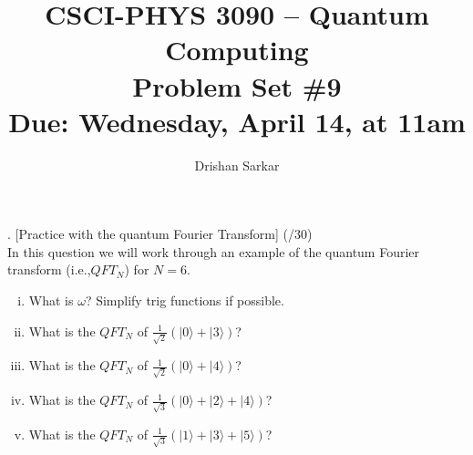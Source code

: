 \documentclass[11pt]{article}
\begin{document}
\date{}
\author{Drishan Sarkar}
\title{CSCI-PHYS 3090 -- Quantum Computing \\ Problem Set \#9 \\ Due: Wednesday, April 14, at 11am}
\maketitle

. [Practice with the quantum Fourier Transform] (/30)
\\
In this question we will work through an example of the quantum Fourier transform (i.e.,$QFT_N$) for $N = 6$.

\begin{enumerate}[(i)]
    \item What is $\omega$? Simplify trig functions if possible.
    \item What is the $QFT_N$ of $\frac{1}{\sqrt{2}}(|0\rangle +|3\rangle)$?
    \item What is the $QFT_N$ of $\frac{1}{\sqrt{2}}(|0\rangle +|4\rangle)$?
    \item What is the $QFT_N$ of $\frac{1}{\sqrt{3}}(|0\rangle +|2\rangle+|4\rangle)$?
    \item What is the $QFT_N$ of $\frac{1}{\sqrt{3}}(|1\rangle +|3\rangle+|5\rangle)$?
\end{enumerate}
\end{document}
